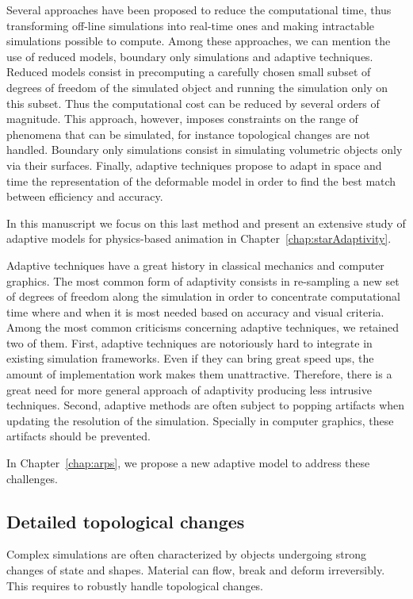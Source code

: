 Several approaches have been proposed to reduce the computational time, thus transforming off-line simulations into real-time ones and making intractable simulations possible to compute. 
Among these approaches, we can mention the use of reduced models, boundary only simulations and adaptive techniques. 
Reduced models consist in precomputing a carefully chosen small subset of degrees of freedom of the simulated object and running the simulation only on this subset. 
Thus the computational cost can be reduced by several orders of magnitude. 
This approach, however, imposes constraints on the range of phenomena that can be simulated, for instance topological changes are not handled. 
Boundary only simulations consist in simulating volumetric objects only via their surfaces. 
Finally, adaptive techniques propose to adapt in space and time the representation of the deformable model in order to find the best match between efficiency and accuracy. 


In this manuscript we focus on this last method and present an extensive study of adaptive models for physics-based animation in Chapter~\ref{chap:starAdaptivity}.


Adaptive techniques have a great history in classical mechanics and computer graphics. The most common form of adaptivity consists in re-sampling a new set of degrees of freedom along the simulation in order to concentrate computational time where and when it is most needed based on accuracy and visual criteria. Among the most common criticisms concerning adaptive techniques, we retained two of them. First, adaptive techniques are notoriously hard to integrate in existing simulation frameworks. Even if they can bring great speed ups, the amount of implementation work makes them unattractive. Therefore, there is a great need for more general approach of adaptivity producing less intrusive techniques. Second, adaptive methods are often subject to popping artifacts when updating the resolution of the simulation. Specially in computer graphics, these artifacts should be prevented.


In Chapter~\ref{chap:arps}, we propose a new adaptive model to address these challenges.

\subsection{Detailed topological changes}

Complex simulations are often characterized by objects undergoing strong changes of state and shapes. Material can flow, break and deform irreversibly. This requires to robustly handle topological changes.

